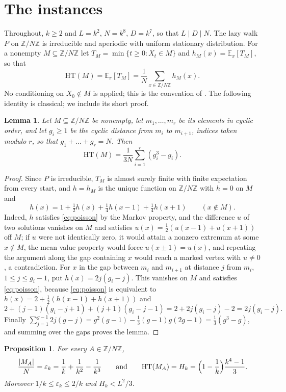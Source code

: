 \documentclass{amsart}
\theoremstyle{plain}
\newtheorem{lemma}[theorem]{Lemma}
\newtheorem{proposition}[theorem]{Proposition}
\theoremstyle{definition}
\theoremstyle{remark}
\newcommand{\Z}{\mathbb{Z}}
\newcommand{\E}{\mathbb{E}}
\newcommand{\eps}{\varepsilon}
\newcommand{\HT}{\mathrm{HT}}
\begin{document}
\section{The instances}\label{sec:instances}

Throughout, $k\ge 2$ and $L=k^2$, $N=k^8$, $D=k^7$, so that $L\mid D\mid N$. The lazy walk $P$ on $\Z/N\Z$ is irreducible and aperiodic with uniform stationary distribution. For a nonempty $M\subseteq\Z/N\Z$ let $T_M=\min\{t\ge 0: X_t\in M\}$ and $h_M(x)=\E_x[T_M]$, so that
\[
\HT(M)=\E_\pi[T_M]=\frac1N\sum_{x\in\Z/N\Z}h_M(x).
\]
No conditioning on $X_0\notin M$ is applied; this is the convention of \cite[Section~2]{AC}. The following identity is classical; we include its short proof.

\begin{lemma}\label{lem:gaps}
Let $M\subseteq\Z/N\Z$ be nonempty, let $m_1,\dots,m_r$ be its elements in cyclic order, and let $g_i\ge 1$ be the cyclic distance from $m_i$ to $m_{i+1}$, indices taken modulo $r$, so that $g_1+\dots+g_r=N$. Then
\[
\HT(M)=\frac1{3N}\sum_{i=1}^r (g_i^3-g_i).
\]
\end{lemma}

\begin{proof}
Since $P$ is irreducible, $T_M$ is almost surely finite with finite expectation from every start, and $h=h_M$ is the unique function on $\Z/N\Z$ with $h=0$ on $M$ and
\begin{equation}\label{eq:poisson}
h(x)=1+\tfrac12 h(x)+\tfrac14 h(x-1)+\tfrac14 h(x+1)\qquad (x\notin M).
\end{equation}
Indeed, $h$ satisfies \eqref{eq:poisson} by the Markov property, and the difference $u$ of two solutions vanishes on $M$ and satisfies $u(x)=\frac12(u(x-1)+u(x+1))$ off $M$; if $u$ were not identically zero, it would attain a nonzero extremum at some $x\notin M$, the mean value property would force $u(x\pm1)=u(x)$, and repeating the argument along the gap containing $x$ would reach a marked vertex with $u\neq 0$, a contradiction. For $x$ in the gap between $m_i$ and $m_{i+1}$ at distance $j$ from $m_i$, $1\le j\le g_i-1$, put $h(x)=2j(g_i-j)$. This vanishes on $M$ and satisfies \eqref{eq:poisson}, because \eqref{eq:poisson} is equivalent to $h(x)=2+\frac12(h(x-1)+h(x+1))$ and
\[
2+(j-1)(g_i-j+1)+(j+1)(g_i-j-1)=2+2j(g_i-j)-2=2j(g_i-j).
\]
Finally $\sum_{j=1}^{g-1}2j(g-j)=g^2(g-1)-\frac13(g-1)g(2g-1)=\frac13(g^3-g)$, and summing over the gaps proves the lemma.
\end{proof}

\begin{proposition}\label{prop:instances}
For every $A\in\Z/N\Z$,
\[
\frac{|M_A|}{N}=\eps_k=\frac1k+\frac1{k^2}-\frac1{k^3}
\qquad\text{and}\qquad
\HT(M_A)=H_k=\Bigl(1-\frac1k\Bigr)\frac{k^4-1}{3}.
\]
Moreover $1/k\le\eps_k\le 2/k$ and $H_k<L^2/3$.
\end{proposition}
\end{document}
